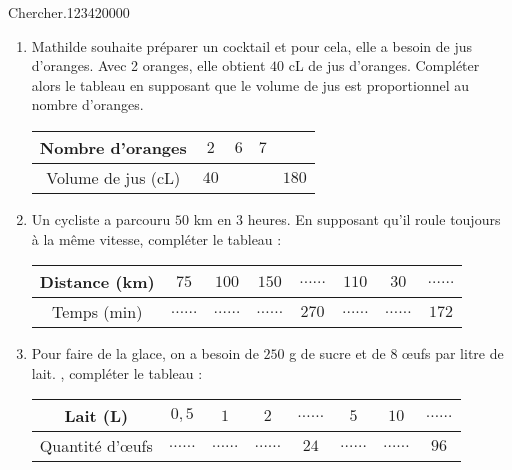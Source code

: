 \begin{pageAD} 

 


\begin{ExoCad}{Chercher.}{1234}{2}{0}{0}{0}{0}


 \begin{enumerate}
 \item Mathilde souhaite préparer un cocktail et pour cela, elle a besoin de jus d'oranges.
 Avec 2 oranges, elle obtient $40$ cL de jus d'oranges. Compléter alors le tableau en supposant que le volume de jus est proportionnel au nombre d'oranges.
 \begin{center}
     \begin{tabular}{|c|c|c|c|c|}\hline
         Nombre d'oranges & $2$ & $6$ & $7$ &  \\
         \hline Volume de jus (cL) & $40$ &  & & $180$ \\\hline
     \end{tabular}
 \end{center}
 
 
 \item Un cycliste a parcouru $50$ km en 3 heures. En supposant qu’il roule toujours à la
 même vitesse, compléter le tableau :
 \begin{center}
     \begin{tabular}{|c|c|c|c|c|c|c|c|}\hline
         Distance (km) & $75$ & $100$ & $150$ &  $\ldots\ldots$  & $110$ & $30$ &  $\ldots\ldots$ \\\hline
          Temps (min) &  $\ldots\ldots$ &  $\ldots\ldots$  &  $\ldots\ldots$ & $270$ &  $\ldots\ldots$ &  $\ldots\ldots$& $172$ \\\hline
     \end{tabular}
 \end{center} 
 

 \item Pour faire de la glace, on a besoin de $250$ g de sucre et de $8$ œufs par litre de lait. , compléter le tableau :
 \begin{center}
     \begin{tabular}{|c|c|c|c|c|c|c|c|}\hline
         Lait (L) & $0,5$ & $1$ & $2$ &  $\ldots\ldots$ & $5$ & $10$ &  $\ldots\ldots$ \\\hline
          Quantité d'œufs &  $\ldots\ldots$ & $\ldots\ldots$   & $\ldots\ldots$ & $24$ & $\ldots\ldots$ & $\ldots\ldots$ &  $96$ \\\hline
     \end{tabular}
 \end{center} 
 
 \end{enumerate}

\end{ExoCad}

 
\end{pageAD} 
 
